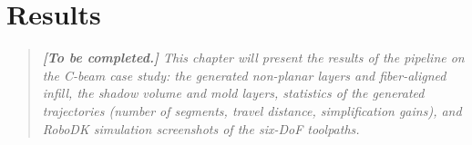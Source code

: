\section{Results}\label{sec:results}


\begin{quote}
\itshape
\textbf{[To be completed.]} This chapter will present the results of
the pipeline on the C-beam case study: the generated non-planar layers
and fiber-aligned infill, the shadow volume and mold layers, statistics
of the generated trajectories (number of segments, travel distance,
simplification gains), and RoboDK simulation screenshots of the
six-DoF toolpaths.
\end{quote}
